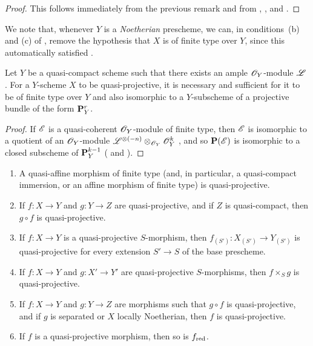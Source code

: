 \begin{proof}
\label{proof-2.5.3.2}
This follows immediately from the previous remark and from , , and .
\end{proof}

We note that, whenever $Y$ is a \emph{Noetherian} prescheme, we can, in conditions~(b) and (c) of , remove the hypothesis that $X$ is of finite type over $Y$, since this automatically satisfied .

\begin{cor}[5.3.3]
\label{2.5.3.3}
Let $Y$ be a quasi-compact scheme such that there exists an ample $\mathscr{O}_Y$-module $\mathscr{L}$ .
For a $Y$-scheme $X$ to be quasi-projective, it is necessary and sufficient for it to be of finite type over $Y$ and also isomorphic to a $Y$-subscheme of a projective bundle of the form $\mathbf{P}_Y^r$.
\end{cor}

\begin{proof}
\label{proof-2.5.3.3}
If $\mathscr{E}$ is a quasi-coherent $\mathscr{O}_Y$-module of finite type, then $\mathscr{E}$ is isomorphic to a quotient of an $\mathscr{O}_Y$-module $\mathscr{L}^{\otimes(-n)}\otimes_{\mathscr{O}_Y}\mathscr{O}_Y^k$ , and so $\mathbf{P}(\mathscr{E})$ is isomorphic to a closed subscheme of $\mathbf{P}_Y^{k-1}$ ( and ).
\end{proof}

\begin{prop}[5.3.4]
\label{2.5.3.4}
\medskip\noindent
\begin{enumerate}[label=\emph{(\roman*)}]
  \item A quasi-affine morphism of finite type (and, in particular, a quasi-compact immersion, or an affine morphism of finite type) is quasi-projective.
  \item If $f:X\to Y$ and $g:Y\to Z$ are quasi-projective, and if $Z$ is quasi-compact, then $g\circ f$ is quasi-projective.
  \item If $f:X\to Y$ is a quasi-projective $S$-morphism, then $f_{(S')}:X_{(S')}\to Y_{(S')}$ is quasi-projective for every extension $S'\to S$ of the base prescheme.
  \item If $f:X\to Y$ and $g:X'\to Y'$ are quasi-projective $S$-morphisms, then $f\times_S g$ is quasi-projective.
  \item If $f:X\to Y$ and $g:Y\to Z$ are morphisms such that $g\circ f$ is quasi-projective, and if $g$ is separated or $X$ locally Noetherian, then $f$ is quasi-projective.
  \item If $f$ is a quasi-projective morphism, then so is $f_{\mathrm{red}}$.
\end{enumerate}
\end{prop}

